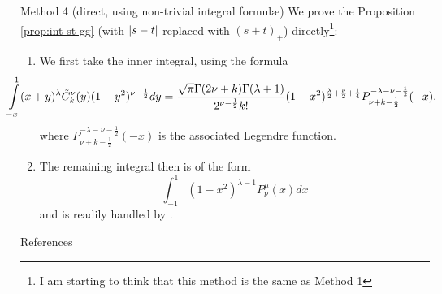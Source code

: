 \documentclass[pdf,notes]{beamer}
\begin{document}
\begin{frame}{Method 4 (direct, using non-trivial integral formul\ae)}
	We prove the Proposition \ref{prop:int-st-gg} (with $\left|s-t\right|$ replaced with $(s+t)_+$) directly\footnote{I am starting to think that this method is the same as Method 1}:
	\begin{enumerate}
		\item We first take the inner integral, using the formula \cite[7.4.11]{kobayashi2011schrodinger}
			{
				\scriptsize
			\begin{equation*}
				\kern-1cm\int_{-x}^1(x+y)^\lambda \tilde{C}_k^\nu(y)(1-y^2)^{\nu-\frac{1}{2}}dy=\frac{\sqrt{\pi}\Gamma(2\nu+k)\Gamma(\lambda+1)}{2^{\nu-\frac{1}{2}}k!}
				(1-x^2)^{\frac{\lambda}{2}+\frac{\nu}{2}+\frac{1}{4}}P_{\nu+k-\frac{1}{2}}^{-\lambda-\nu-\frac{1}{2}}(-x).
			\end{equation*}
		}
			where $P_{\nu+k-\frac{1}{2}}^{-\lambda-\nu-\frac{1}{2}}(-x)$ is the associated Legendre function. 
		\item The remaining integral then is of the form\begin{equation*}
				\int_{-1}^1(1-x^2)^{\lambda-1}P_{\nu}^{\mu}(x)dx
			\end{equation*} and is readily handled by \cite[7.132.1]{gradshteinryzhik}.
	\end{enumerate}
\end{frame}
\begin{frame}[allowframebreaks]{References}
	
	\nocite{Selberg:411367}
	\nocite{warnaar2010sl3}
	\nocite{dotsenko1985four}
	\nocite{tarasov2003selberg}

\end{frame}
\end{document}
